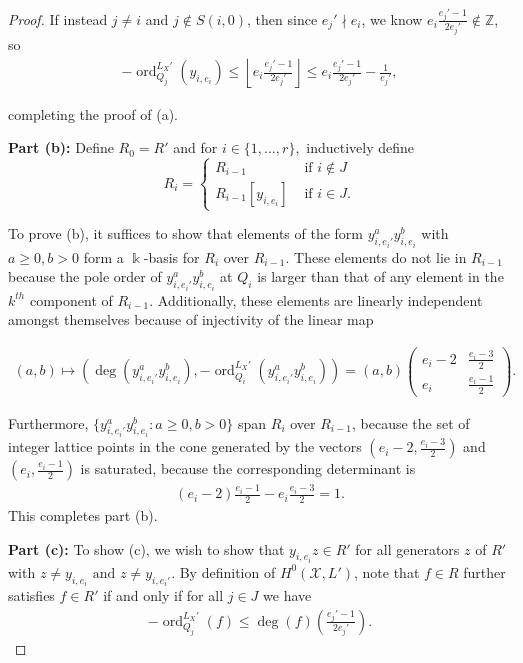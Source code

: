 \documentclass{amsart}
\theoremstyle{plain}
\theoremstyle{definition}
\theoremstyle{remark}
\numberwithin{equation}{section}
\newcommand\BZ{{\mathbb Z}}
\newcommand\Bk{{\Bbbk}}
\DeclareMathOperator{\ord}{ord}
\newcommand\sx{\mathscr X}
\newcommand \subhalf[1]{\frac{{#1} - 1}{2{#1}}}
\newcommand{\halfcan}{L}
\begin{document}
\begin{proof}
If instead $j\ne i$ and $j \notin S(i,0)$, then since $e_j' \nmid e_i$, we know
$e_i\subhalf{e_j'} \notin \BZ$, so
\begin{align*}
	-\ord_{Q_j}
^{\halfcan_X'}(y_{i, e_i}) \leq \left\lfloor  e_i\subhalf{e_j'} \right\rfloor 
	\leq e_i\subhalf{e_j'} - \frac{1}{e_j'},
\end{align*}

\noindent
completing the proof of (a).

{\bf Part (b):}
Define $R_0 = R'$ and for $i \in \{1, \ldots, r\},$ inductively define 
$$R_i = \begin{cases}
	R_{i - 1} &\text{ if }i \notin J\\
	R_{i - 1}[y_{i, e_i}] &\text{ if }i \in J. 
\end{cases}$$

\noindent
To prove (b), it suffices to show that elements of the form $y_{i, e_
i'}^ay_{i, e_i}^b$ with $a \geq 0, b > 0$ form a $\Bk$-basis for $R_{i}$ over $R_{i-1}$. These elements do not lie in $R_{i - 1}$ because the pole order of $y_{i, e_i'}^ay_{i,e_i}^b$ at $Q_i$ is larger than that of any element in the $k^{th}$ component of $R_{i - 1}$. 
Additionally, these elements are linearly independent amongst themselves because of
injectivity of the linear map

\begin{align*}
	(a,b) \mapsto \left( \deg\left(y_{i, e_i'}^ay_{i, e_i}^b\right),-
	\ord_{Q_i}
^{\halfcan_X'}\left( y_{i, e_i'}^ay_{i, e_i}^b \right)  \right) = (a,b) 
	\begin{pmatrix}
		e_i -2 & \frac{e_i -3}{2} \\
		e_i	 & \frac{e_i - 1}{2}
	\end{pmatrix}.
\end{align*}

\noindent
Furthermore, $\{y_{i, e_i'}^a y_{i, e_i}^b:a \geq 0,
b > 0\}$ span $R_i$ over $R_{i - 1}$, because the set of
integer lattice points in the cone generated by the vectors $\left(e
_i -2, \frac{e_i -3}{2} \right)$ and $\left(e_i, \frac{e_i - 1}{2}
\right)$ is saturated, because the corresponding determinant is
\begin{align*}
	(e_i -2) \frac{e_i - 1}{2} - e_i \frac{e_i -3}{2} = 1.
\end{align*}
This completes part (b).

{\bf Part (c):}
To show (c), we wish to show that $y_{i, e_i}z \in R'$ for all generators $z$ of $R'$
with $z \neq y_{i, e_i} \text{ and } z \neq y_{i, e_i'}$. By definition of $H^0(\sx,\halfcan')$, note that $f \in R$ further satisfies $f \in R'$ if and
only if for all $j \in J$ we have
\begin{align}
\label{eqn:order-degree}
	-\ord_{Q_j}
^{\halfcan_X'}(f) \leq \deg (f) \left( \subhalf {e_j'} \right).
\end{align}


\end{proof}
\end{document}

